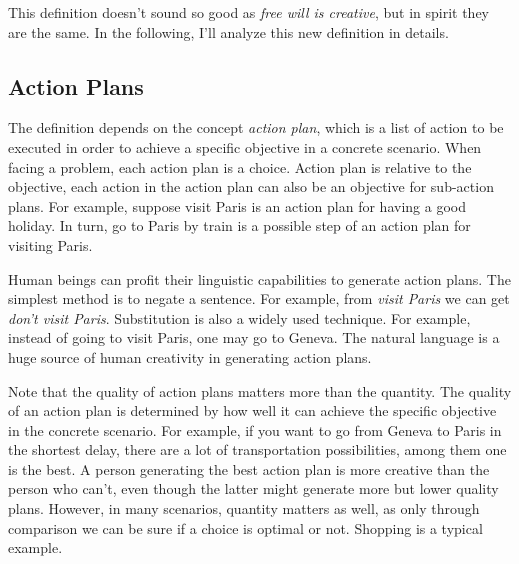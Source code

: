 This definition doesn't sound so good as \emph{free will is creative}, but in spirit they are the same. In the following, I'll analyze this new definition in details.


\subsection{Action Plans}

The definition depends on the concept \emph{action plan}, which is a list of action to be executed in order to achieve a specific objective in a concrete scenario. When facing a problem, each action plan is a choice. Action plan is relative to the objective, each action in the action plan can also be an objective for sub-action plans. For example, suppose visit Paris is an action plan for having a good holiday. In turn, go to Paris by train is a possible step of an action plan for visiting Paris.

Human beings can profit their linguistic capabilities to generate action plans. The simplest method is to negate a sentence. For example, from \emph{visit Paris} we can get \emph{don’t visit Paris}. Substitution is also a widely used technique. For example, instead of going to visit Paris, one may go to Geneva. The natural language is a huge source of human creativity in generating action plans.

Note that the quality of action plans matters more than the quantity. The quality of an action plan is determined by how well it can achieve the specific objective in the concrete scenario. For example, if you want to go from Geneva to Paris in the shortest delay, there are a lot of transportation possibilities, among them one is the best. A person generating the best action plan is more creative than the person who can’t, even though the latter might generate more but lower quality plans. However, in many scenarios, quantity matters as well, as only through comparison we can be sure if a choice is optimal or not. Shopping is a typical example.


